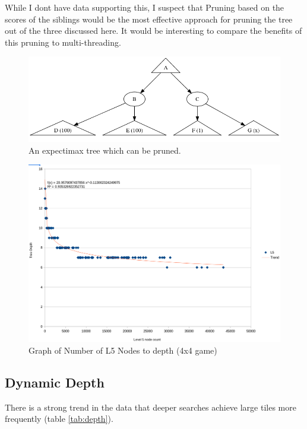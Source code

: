 \documentclass{article}
\begin{document}
While I don\textquotesingle t have data supporting this, I suspect that Pruning based on the scores of the siblings would be the most effective approach for pruning the tree out of the three discussed here. It would be interesting to compare the benefits of this pruning to multi-threading.

\begin{landscape}
    \begin{figure}
    \centering
    \includegraphics[width=1.5\textwidth]{pruningExample.png}
    \caption{An expectimax tree which can be pruned.}
    \label{fig:prunepmoves}
\end{figure}
\end{landscape}




\begin{landscape}
    \begin{figure}
    \centering
    \includegraphics[width=1.30\textwidth]{depth.png}
    \caption{Graph of Number of L5 Nodes to depth (4x4 game)}
    \label{fig:dynamic_depth_graph}
\end{figure}
\end{landscape}

\subsection{Dynamic Depth}
There is a strong trend in the data that deeper searches achieve large tiles more frequently (table \ref{tab:depth}).
\end{document}
